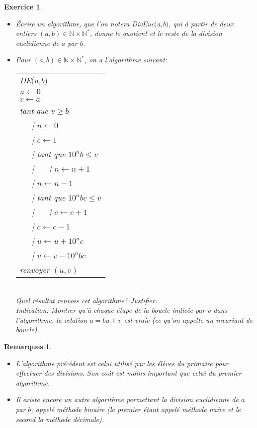 \documentclass[11pt,a4paper]{article}
\newtheorem{ex}{Exercice}
\newtheorem*{rem2}{Remarques}
\begin{document}
\begin{ex}\
\begin{itemize}
\item[$1.$] Écrire un algorithme, que l'on notera DivEuc$($a,b$)$, qui à partir de deux entiers $(a,b) \in \mathbb{N}\times \mathbb{N}^* $, donne le quotient et le reste de la division euclidienne de $a$ par $b$.
\item[$2.$]
Pour $(a,b) \in \mathbb{N}\times \mathbb{N}^*$, on a l'algorithme suivant:

\begin{center}
\begin{tabular}{l}
DE$($a,b$)$\\
$ u \leftarrow 0$ \\
$v \leftarrow a$ \\
tant que $v \geqslant b$ \\
\ \ \ {\rm |} $n \leftarrow 0$ \\
\ \ \ {\rm |}   $c \leftarrow 1$ \\
\ \ \ {\rm |}   tant que $10^n b \leqslant v$ \\ 
\ \ \ {\rm |} \ \ \ {\rm |} $n \leftarrow n+1$\\
\ \ \ {\rm |}     $n \leftarrow n-1$ \\
\ \ \ {\rm |}    tant que $10^{n}bc \leqslant v$ \\ 
 \ \ \ {\rm |} \ \ \ {\rm |}    $c \leftarrow c+1$\\
 \ \ \ {\rm |}  $c \leftarrow c-1$ \\
\ \ \ {\rm |}     $u \leftarrow u+10^{n}c$\\
\ \ \ {\rm |}   $v \leftarrow v-10^{n}bc$\\
renvoyer $(u,v)$      \\

\end{tabular}
\end{center}
\ \\
Quel résultat renvoie cet algorithme? Justifier. \\
\textit{Indication: Montrer qu'à chaque étape de la boucle indicée par $v$ dans l'algorithme, la relation $a=bu+v$ est vraie (ce qu'on appelle un invariant de boucle).}

\end{itemize}  
  
  
\end{ex}

\begin{rem2}\
\begin{itemize}
\item[•] L'algorithme précédent est celui utilisé par les élèves du primaire pour effectuer des divisions. Son coût est moins important que celui du premier algorithme.
\item[•] Il existe encore un autre algorithme permettant la division euclidienne de $a$ par $b$, appelé méthode binaire (le premier étant appelé méthode naïve et le second la méthode décimale).
\end{itemize}
\end{rem2}
\end{document}
